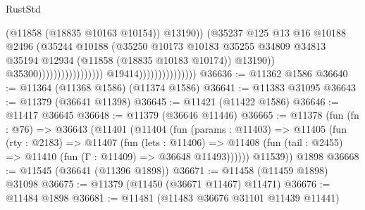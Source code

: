 \begin{lexlean}{RustStd}
\begin{coremodule}
                                                                      (@11858
                                                                        (@18835 @10163 @10154))
                                                                      @13190))
                                                                  (@35237
                                                                    @125
                                                                    @13
                                                                    @16
                                                                    @10188
                                                                    @2496
                                                                    (@35244
                                                                      @10188
                                                                      (@35250
                                                                        @10173
                                                                        @10183
                                                                        @35255
                                                                        @34809
                                                                        @34813
                                                                        @35194
                                                                        @12934
                                                                        (@11858
                                                                          (@18835 @10183 @10174))
                                                                        @13190))
                                                                    @35300)))))))))))))))))
                                  @19414)))))))))))))))
@36636 := @11362 @1586
@36640 := @11364 (@11368 @1586) (@11374 @1586)
@36641 := @11383 @31095
@36643 := @11379 (@36641 @11398)
@36645 := @11421 (@11422 @1586)
@36646 := @11417 @36645
@36648 := @11379 (@36646 @11446)
@36665 := @11378
    (fun (fn : @76) =>
    @36643
      (@11401
        (@11404
          (fun (params : @11403) =>
          @11405
            (fun (rty : @2183) =>
            @11407
              (fun (lets : @11406) =>
              @11408 (fun (tail : @2455) => @11410 (fun (Γ : @11409) => @36648 @11493))))))
        @11539))
    @1898
@36668 := @11545 (@36641 (@11396 @1898))
@36671 := @11458 (@11459 @1898) @31098
@36675 := @11379 (@11450 (@36671 @11467) @11471)
@36676 := @11484 @1898
@36681 := @11481 (@11483 @36676 @31101 @11439 @11441)

\end{coremodule}
\end{lexlean}
